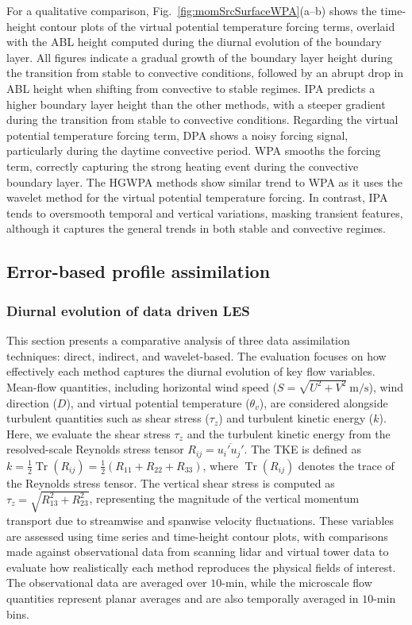 For a qualitative comparison, Fig.~\ref{fig:momSrcSurfaceWPA}(a--b) shows the time-height contour plots of the virtual potential temperature forcing terms, overlaid with the ABL height computed during the diurnal evolution of the boundary layer. All figures indicate a gradual growth of the boundary layer height during the transition from stable to convective conditions, followed by an abrupt drop in ABL height when shifting from convective to stable regimes. IPA predicts a higher boundary layer height than the other methods, with a steeper gradient during the transition from stable to convective conditions. Regarding the virtual potential temperature forcing term, DPA shows a noisy forcing signal, particularly during the daytime convective period. WPA smooths the forcing term, correctly capturing the strong heating event during the convective boundary layer. The HGWPA methods show similar trend to WPA as it uses the wavelet method for the virtual potential temperature forcing. In contrast, IPA tends to oversmooth temporal and vertical variations, masking transient features, although it captures the general trends in both stable and convective regimes.

\FloatBarrier 
\subsection{\textbf{Error-based profile assimilation}}
\label{sec:errorBased}

\subsubsection{Diurnal evolution of data driven LES}
This section presents a comparative analysis of three data assimilation techniques: direct, indirect, and wavelet-based. The evaluation focuses on how effectively each method captures the diurnal evolution of key flow variables. Mean-flow quantities, including horizontal wind speed ($S=\sqrt{U^2 + V^2}~\mathrm{m/s}$), wind direction ($D$), and virtual potential temperature ($\theta_v$), are considered alongside turbulent quantities such as shear stress ($\tau_z$) and turbulent kinetic energy ($k$). Here, we evaluate the shear stress \(\tau_z\) and the turbulent kinetic energy from the resolved-scale Reynolds stress tensor \(R_{ij} = \overline{u_i' u_j'}\). The TKE is defined as \(k = \frac{1}{2} \operatorname{Tr}(R_{ij}) = \frac{1}{2}(R_{11} + R_{22} + R_{33})\), where \(\operatorname{Tr}(R_{ij})\) denotes the trace of the Reynolds stress tensor. The vertical shear stress is computed as \(\tau_z = \sqrt{R_{13}^2 + R_{23}^2}\), representing the magnitude of the vertical momentum transport due to streamwise and spanwise velocity fluctuations. These variables are assessed using time series and time-height contour plots, with comparisons made against observational data from scanning lidar and virtual tower data to evaluate how realistically each method reproduces the physical fields of interest. The observational data are averaged over $10$-$\mathrm{min}$, while the microscale flow quantities represent planar averages and are also temporally averaged in $10$-$\mathrm{min}$ bins.

